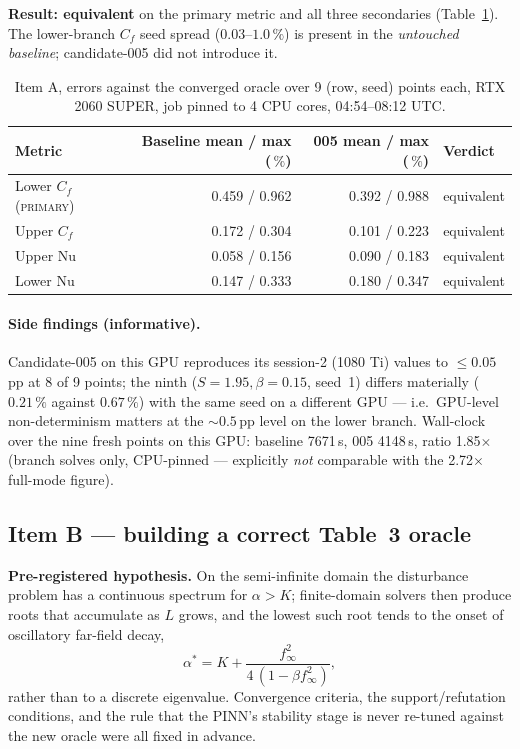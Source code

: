 \documentclass[11pt,a4paper]{article}
\newcommand{\pct}{\,\%}
\begin{document}
\textbf{Result: equivalent} on the primary metric and all three secondaries
(Table~\ref{tab:itemA}). The lower-branch $C_f$ seed spread ($0.03$--$1.0\pct$) is present
in the \emph{untouched baseline}; candidate-005 did not introduce it.

\begin{table}[ht]
\centering
\caption{Item A, errors against the converged oracle over 9 (row, seed) points each,
RTX 2060 SUPER, job pinned to 4 CPU cores, 04:54--08:12 UTC.}
\label{tab:itemA}
\small
\begin{tabular}{@{}lrrl@{}}
\toprule
\textbf{Metric} & \textbf{Baseline mean / max ($\pct$)} & \textbf{005 mean / max ($\pct$)} & \textbf{Verdict} \\
\midrule
Lower $C_f$ (\textsc{primary}) & 0.459 / 0.962 & 0.392 / 0.988 & equivalent \\
Upper $C_f$                    & 0.172 / 0.304 & 0.101 / 0.223 & equivalent \\
Upper $\mathrm{Nu}$            & 0.058 / 0.156 & 0.090 / 0.183 & equivalent \\
Lower $\mathrm{Nu}$            & 0.147 / 0.333 & 0.180 / 0.347 & equivalent \\
\bottomrule
\end{tabular}
\end{table}

\paragraph{Side findings (informative).} Candidate-005 on this GPU reproduces its
session-2 (1080 Ti) values to $\leq0.05$\,pp at 8 of 9 points; the ninth
($S{=}1.95,\beta{=}0.15$, seed~1) differs materially ($0.21\pct$ against $0.67\pct$) with
the same seed on a different GPU --- i.e.\ GPU-level non-determinism matters at the
${\sim}0.5$\,pp level on the lower branch. Wall-clock over the nine fresh points on this
GPU: baseline 7671\,s, 005 4148\,s, ratio 1.85$\times$ (branch solves only, CPU-pinned ---
explicitly \emph{not} comparable with the 2.72$\times$ full-mode figure).

\subsection{Item B --- building a correct Table~3 oracle}
\textbf{Pre-registered hypothesis.} On the semi-infinite domain the disturbance problem has
a continuous spectrum for $\alpha>K$; finite-domain solvers then produce roots that
accumulate as $L$ grows, and the lowest such root tends to the onset of oscillatory
far-field decay,
\begin{equation}
  \alpha^{*} = K + \frac{f_\infty^2}{4\,(1-\beta f_\infty^2)},
\end{equation}
rather than to a discrete eigenvalue. Convergence criteria, the support/refutation
conditions, and the rule that the PINN's stability stage is never re-tuned against the new
oracle were all fixed in advance.
\end{document}
